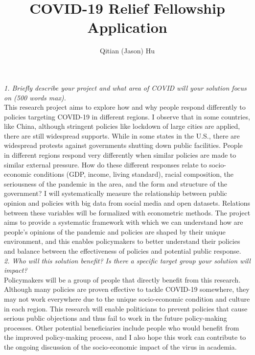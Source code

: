 \documentclass{article}
\title{COVID-19 Relief Fellowship Application}
\author{Qitian (Jason) Hu}
\begin{document}
\maketitle %
\textit{1. Briefly describe your project and what area of COVID will your solution focus on (500 words max).}\\
This research project aims to explore how and why people respond differently to policies targeting COVID-19 in different regions. I observe that in some countries, like China, although stringent policies like lockdown of large cities are applied, there are still widespread supports. While in some states in the U.S., there are widespread protests against governments shutting down public facilities. People in different regions respond very differently when similar policies are made to similar external pressure. How do these different responses relate to socio-economic conditions (GDP, income, living standard), racial composition, the seriousness of the pandemic in the area, and the form and structure of the government? I will systematically measure the relationship between public opinion and policies with big data from social media and open datasets. Relations between these variables will be formalized with econometric methods. The project aims to provide a systematic framework with which we can understand how are people's opinions of the pandemic and policies are shaped by their unique environment, and this enables policymakers to better understand their policies and balance between the effectiveness of policies and potential public response. \\

\textit{2. Who will this solution benefit? Is there a specific target group your solution will impact?}\\
Policymakers will be a group of people that directly benefit from this research. Although many policies are proven effective to tackle COVID-19 somewhere, they may not work everywhere due to the unique socio-economic condition and culture in each region. This research will enable politicians to prevent policies that cause serious public objections and thus fail to work in the future policy-making processes. Other potential beneficiaries include people who would benefit from the improved policy-making process, and I also hope this work can contribute to the ongoing discussion of the socio-economic impact of the virus in academia. \\
\end{document}
